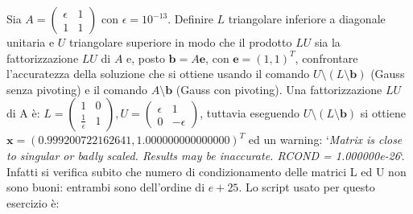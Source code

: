 Sia $A = \begin{pmatrix} \epsilon & 1 \\ 1 & 1  \end{pmatrix}$ con $\epsilon = 10^{-13}$. Definire $L$ triangolare inferiore a diagonale unitaria e $U$ triangolare superiore in modo che il prodotto $LU$ sia la fattorizzazione $LU$ di $A$ e, posto $\mathbf{b} = A\mathbf{e}$, con $\mathbf{e} = (1, 1)^T$, confrontare l'accuratezza della soluzione che si ottiene usando il comando $U\setminus(L\setminus \mathbf{b})$ (Gauss senza pivoting) e il comando $A\setminus \mathbf{b}$ (Gauss con pivoting).
\PP
Una fattorizzazione $LU$ di A è: $L = \begin{pmatrix} 1 & 0 \\ \frac{1}{\epsilon} & 1  \end{pmatrix}, U = \begin{pmatrix} \epsilon & 1 \\ 0 & -\epsilon  \end{pmatrix}$, tuttavia eseguendo $U\setminus(L\setminus \mathbf{b})$ si ottiene $\mathbf{x} = (0.999200722162641, 1.000000000000000)^T$ ed un warning: `\textit{Matrix is close to singular or badly scaled. Results may be inaccurate. RCOND =
1.000000e-26}`. Infatti si verifica subito che numero di condizionamento delle matrici L ed U non sono buoni: entrambi sono dell'ordine di $e+25$.
Lo script usato per questo esercizio è:




